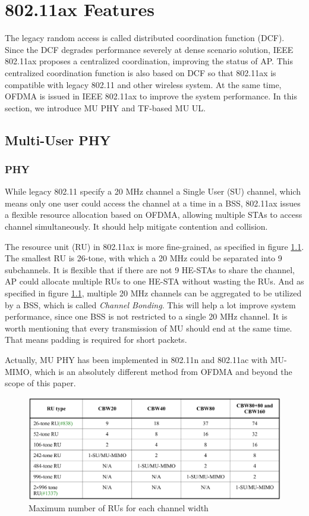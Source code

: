 \chapter{802.11ax Features}			\label{sec_ax_feature}
The legacy random access is called distributed coordination function (DCF). 
Since the DCF degrades performance severely at dense scenario solution, IEEE 802.11ax proposes a centralized coordination, improving the status of AP. 
This centralized coordination function is also based on DCF so that 802.11ax is compatible with legacy 802.11 and other wireless system. 
At the same time, OFDMA is issued in IEEE 802.11ax to improve the system performance. In this section, we introduce MU PHY and TF-based MU UL.
\section{Multi-User PHY}
\subsection{PHY}
While legacy 802.11 specify a 20 MHz channel a Single User (SU) channel, which means only one user could access the channel at a time in a BSS, 802.11ax issues a flexible resource allocation based on OFDMA, allowing multiple STAs to access channel simultaneously.
It should help mitigate contention and collision. 

The resource unit (RU) in 802.11ax is more fine-grained, as specified in figure \ref{fig_RU_spec}. The smallest RU is 26-tone, with which a 20 MHz could be separated into 9 subchannels.
It is flexible that if there are not 9 HE-STAs to share the channel, AP could allocate multiple RUs to one HE-STA without wasting the RUs.
And as specified in figure \ref{fig_RU_spec}, multiple 20 MHz channels can be aggregated to be utilized by a BSS, which is called \textit{Channel Bonding}. 
This will help a lot improve system performance, since one BSS is not restricted to a single 20 MHz channel.  
It is worth mentioning that every transmission of MU should end at the same time. That means padding is required for short packets.



Actually, MU PHY has been implemented in 802.11n and 802.11ac with MU-MIMO, which is an absolutely different method from OFDMA and beyond the scope of this paper. 

\begin{figure}[!t]
\includegraphics[scale=0.25]{./figure/chp2/RU_spec.png}
\caption{Maximum number of RUs for each channel width}
\label{fig_RU_spec}
\end{figure}


